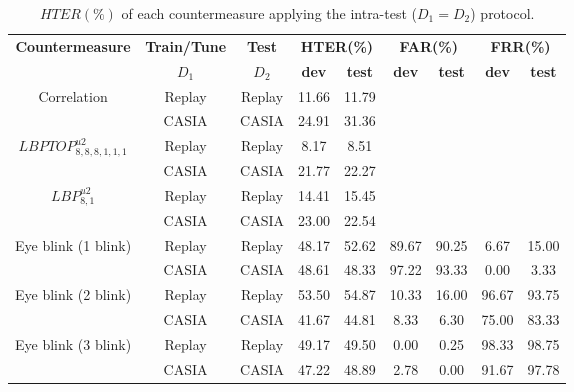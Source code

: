 \hspace{-17mm}\begin{table}[ht!]
\caption{$HTER(\%)$ of each countermeasure applying the intra-test ($D_1=D_2$) protocol.}
\begin{center}
  \begin{tabular}{ | c | c | c | c  c | c  c  | c  c |}
    \hline

   \multirow{2}{*}{\textbf{Countermeasure}} & \textbf{Train/Tune} & \textbf{Test} & \multicolumn{2}{c|}{\textbf{HTER(\%)}} & \multicolumn{2}{c|}{\textbf{FAR(\%)}} & \multicolumn{2}{c|}{\textbf{FRR(\%)}} \\ 
     & $D_1$ & $D_2$ & \textbf{dev} & \textbf{test} & \textbf{dev} & \textbf{test} & \textbf{dev} & \textbf{test}  \\ \hline
    
    \multirow{2}{*}{Correlation} & Replay  & Replay  &  11.66 & 11.79  &  &  &  & \\ 
               & CASIA &  CASIA  & 24.91 & 31.36 & & &  & \\ \hline \hline

    \multirow{2}{*}{$LBPTOP_{8,8,8,1,1,1}^{u2}$}  & Replay & Replay  & 8.17 & 8.51  & & &  &\\
               & CASIA  & CASIA  & 21.77 & 22.27 & & &  &\\ \hline \hline

    \multirow{2}{*}{$LBP_{8,1}^{u2}$} & Replay  & Replay  & 14.41 &15.45 & & &  & \\
               & CASIA  & CASIA  & 23.00  & 22.54 & & &  &\\ \hline \hline
            
    \multirow{2}{*}{Eye blink (1 blink)} & Replay  & Replay  & 48.17 & 52.62 & 89.67 & 90.25 & 6.67 & 15.00\\
               & CASIA  & CASIA  & 48.61 &48.33 & 97.22 & 93.33 & 0.00 & 3.33 \\ \hline \hline

    \multirow{2}{*}{Eye blink (2 blink)} & Replay  & Replay  & 53.50 & 54.87 & 10.33 & 16.00 & 96.67 & 93.75\\
               & CASIA  & CASIA  & 41.67 & 44.81 & 8.33 & 6.30 & 75.00 & 83.33 \\ \hline \hline

    \multirow{2}{*}{Eye blink (3 blink)} & Replay  & Replay  & 49.17 & 49.50 & 0.00 & 0.25& 98.33 & 98.75\\
               & CASIA  & CASIA  & 47.22  & 48.89 & 2.78 & 0.00 & 91.67 & 97.78\\
    \hline
  \end{tabular}
\end{center}
\label{tb:IntraTest}
\end{table}

